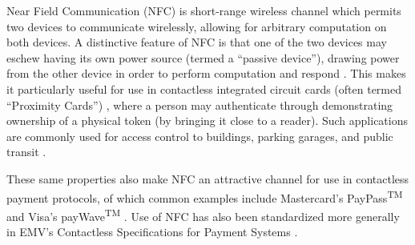 Near Field Communication (NFC) is short-range wireless channel which permits two devices to communicate wirelessly,
    allowing for arbitrary computation on both devices.
A distinctive feature of NFC is that one of the two devices may eschew having its own power source (termed a ``passive device''),
    drawing power from the other device in order to perform computation and respond \cite{nfcspec}.
This makes it particularly useful for use in contactless integrated circuit cards (often termed ``Proximity Cards'') \cite{nfciso},
    where a person may authenticate through demonstrating ownership of a physical token (by bringing it close to a reader).
Such applications are commonly used for access control to buildings, parking garages, and public transit \cite{finvzgar2011use, roberts2006radio, tamrakar2011identity, weinstein2005rfid}.

These same properties also make NFC an attractive channel for use in contactless payment protocols,
    of which common examples include Mastercard's PayPass\textsuperscript{TM} \cite{paypass} and Visa's payWave\textsuperscript{TM} \cite{paywave}.
Use of NFC has also been standardized more generally in EMV's Contactless Specifications for Payment Systems \cite{emv}.
